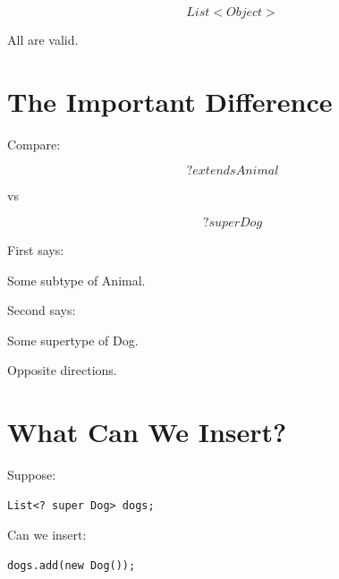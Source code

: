 \documentclass[11pt,a4paper]{book}
\begin{document}

\[
List<Object>
\]


All are valid.


\section{The Important Difference}

Compare:

\[
? extends Animal
\]


vs


\[
? super Dog
\]


First says:


Some subtype of Animal.


Second says:


Some supertype of Dog.


Opposite directions.


\section{What Can We Insert?}

Suppose:

\begin{verbatim} 
List<? super Dog> dogs;
\end{verbatim}


Can we insert:

\begin{verbatim} 
dogs.add(new Dog());
\end{verbatim}
\end{document}
